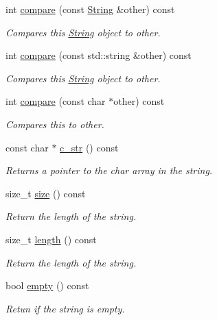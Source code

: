 \begin{DoxyCompactItemize}
int \hyperlink{classtvm_1_1runtime_1_1String_a7ee59f6227213720ef176b995191b4e0}{compare} (const \hyperlink{classtvm_1_1runtime_1_1String}{String} \&other) const 
\begin{DoxyCompactList}\small\item\em Compares this \hyperlink{classtvm_1_1runtime_1_1String}{String} object to other. \end{DoxyCompactList}\item 
int \hyperlink{classtvm_1_1runtime_1_1String_adaa1cef73909f379ca5991ef1ab61c40}{compare} (const std\+::string \&other) const 
\begin{DoxyCompactList}\small\item\em Compares this \hyperlink{classtvm_1_1runtime_1_1String}{String} object to other. \end{DoxyCompactList}\item 
int \hyperlink{classtvm_1_1runtime_1_1String_ad2c11edfba52dedb10ac48e2980ffba6}{compare} (const char $\ast$other) const 
\begin{DoxyCompactList}\small\item\em Compares this to other. \end{DoxyCompactList}\item 
const char $\ast$ \hyperlink{classtvm_1_1runtime_1_1String_a61a280bb2b55d56477bab49e0b8eb187}{c\+\_\+str} () const 
\begin{DoxyCompactList}\small\item\em Returns a pointer to the char array in the string. \end{DoxyCompactList}\item 
size\+\_\+t \hyperlink{classtvm_1_1runtime_1_1String_a44788bd2440eb4ebbada370314536243}{size} () const 
\begin{DoxyCompactList}\small\item\em Return the length of the string. \end{DoxyCompactList}\item 
size\+\_\+t \hyperlink{classtvm_1_1runtime_1_1String_a406e45189b6e0239cf32f717f59d59d2}{length} () const 
\begin{DoxyCompactList}\small\item\em Return the length of the string. \end{DoxyCompactList}\item 
bool \hyperlink{classtvm_1_1runtime_1_1String_a93f37d0bb56661345a4e0bf1c902b685}{empty} () const 
\begin{DoxyCompactList}\small\item\em Retun if the string is empty. \end{DoxyCompactList}\item 

\end{DoxyCompactItemize}
